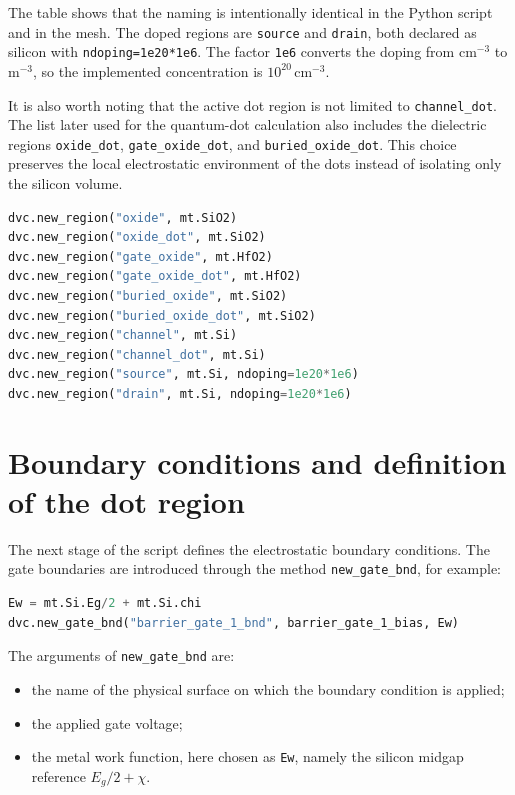 The table shows that the naming is intentionally identical in the Python script and in the mesh. The doped regions are \texttt{source} and \texttt{drain}, both declared as silicon with \texttt{ndoping=1e20*1e6}. The factor \texttt{1e6} converts the doping from \(\mathrm{cm^{-3}}\) to \(\mathrm{m^{-3}}\), so the implemented concentration is \(10^{20}\,\mathrm{cm^{-3}}\).

It is also worth noting that the active dot region is not limited to \texttt{channel\_dot}. The list later used for the quantum-dot calculation also includes the dielectric regions \texttt{oxide\_dot}, \texttt{gate\_oxide\_dot}, and \texttt{buried\_oxide\_dot}. This choice preserves the local electrostatic environment of the dots instead of isolating only the silicon volume.

\begin{lstlisting}[language=Python, caption={Material assignment to the main regions.}]
dvc.new_region("oxide", mt.SiO2)
dvc.new_region("oxide_dot", mt.SiO2)
dvc.new_region("gate_oxide", mt.HfO2)
dvc.new_region("gate_oxide_dot", mt.HfO2)
dvc.new_region("buried_oxide", mt.SiO2)
dvc.new_region("buried_oxide_dot", mt.SiO2)
dvc.new_region("channel", mt.Si)
dvc.new_region("channel_dot", mt.Si)
dvc.new_region("source", mt.Si, ndoping=1e20*1e6)
dvc.new_region("drain", mt.Si, ndoping=1e20*1e6)
\end{lstlisting}

\section{Boundary conditions and definition of the dot region}
The next stage of the script defines the electrostatic boundary conditions. The gate boundaries are introduced through the method \texttt{new\_gate\_bnd}, for example:

\begin{lstlisting}[language=Python, caption={Gate boundaries in the QTCAD script.}]
Ew = mt.Si.Eg/2 + mt.Si.chi
dvc.new_gate_bnd("barrier_gate_1_bnd", barrier_gate_1_bias, Ew)
\end{lstlisting}

\newpage
The arguments of \texttt{new\_gate\_bnd} are:
\begin{itemize}
    \item the name of the physical surface on which the boundary condition is applied;
    \item the applied gate voltage;
    \item the metal work function, here chosen as \texttt{Ew}, namely the silicon midgap reference \(E_g/2 + \chi\).
\end{itemize}

